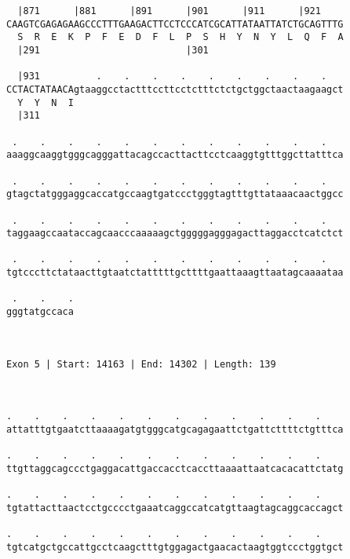 \documentclass{article}
\begin{document}
\begin{Verbatim}
  |871      |881      |891      |901      |911      |921    
CAAGTCGAGAGAAGCCCTTTGAAGACTTCCTCCCATCGCATTATAATTATCTGCAGTTTG
  S  R  E  K  P  F  E  D  F  L  P  S  H  Y  N  Y  L  Q  F  A
  |291                          |301                        
  
  |931          .    .    .    .    .    .    .    .    .   
CCTACTATAACAgtaaggcctactttccttcctctttctctgctggctaactaagaagct
  Y  Y  N  I                                                
  |311                                                      
  
 .    .    .    .    .    .    .    .    .    .    .    .   
aaaggcaaggtgggcagggattacagccacttacttcctcaaggtgtttggcttatttca
                                                            
 .    .    .    .    .    .    .    .    .    .    .    .   
gtagctatgggaggcaccatgccaagtgatccctgggtagtttgttataaacaactggcc
                                                            
 .    .    .    .    .    .    .    .    .    .    .    .   
taggaagccaataccagcaacccaaaaagctgggggagggagacttaggacctcatctct
                                                            
 .    .    .    .    .    .    .    .    .    .    .    .   
tgtcccttctataacttgtaatctatttttgcttttgaattaaagttaatagcaaaataa
                                                            
 .    .    .
gggtatgccaca
            
            
 
Exon 5 | Start: 14163 | End: 14302 | Length: 139



.    .    .    .    .    .    .    .    .    .    .    .    
attatttgtgaatcttaaaagatgtgggcatgcagagaattctgattcttttctgtttca
                                                            
.    .    .    .    .    .    .    .    .    .    .    .    
ttgttaggcagccctgaggacattgaccacctcaccttaaaattaatcacacattctatg
                                                            
.    .    .    .    .    .    .    .    .    .    .    .    
tgtattacttaactcctgcccctgaaatcaggccatcatgttaagtagcaggcaccagct
                                                            
.    .    .    .    .    .    .    .    .    .    .    .    
tgtcatgctgccattgcctcaagctttgtggagactgaacactaagtggtccctggtgct
                                                            

\end{Verbatim}
\end{document}
